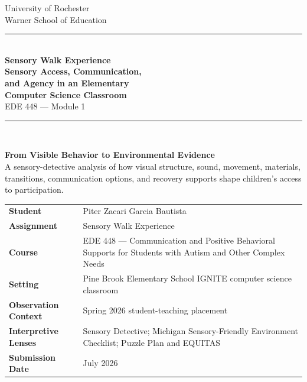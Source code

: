 \documentclass[11pt]{article}
\begin{document}
\hypersetup{pageanchor=false}
\begin{titlepage}
\thispagestyle{empty}

\begin{center}
{\large University of Rochester\\}
{\normalsize Warner School of Education\\[0.15in]}

{\color{PrimaryRed}\rule{\textwidth}{1.4pt}}\\[0.12in]
{\Huge\bfseries Sensory Walk Experience\\[0.08in]
\huge Sensory Access, Communication,\\[0.08in]
and Agency in an Elementary\\[0.08in]
Computer Science Classroom}\\[0.18in]
{\Large EDE 448 --- Module 1}\\[0.12in]

\vfill

{\color{PrimaryRed}\rule{0.78\textwidth}{0.7pt}}\\[0.22in]

\colorbox{SoftBlue}{%
\parbox{0.88\textwidth}{%
\centering\small\vspace{0.02in}
\textbf{From Visible Behavior to Environmental Evidence}\\[0.05in]
A sensory-detective analysis of how visual structure, sound, movement, materials, transitions, communication options, and recovery supports shape children's access to participation.
}%
}
\end{center}

\vfill

\begin{center}
\renewcommand{\arraystretch}{1.18}
\setlength{\tabcolsep}{4pt}
\begin{tabular}{>{\bfseries\RaggedLeft}p{1.55in} p{4.95in}}
Student & Piter Zacari Garcia Bautista \\
Assignment & Sensory Walk Experience \\
Course & EDE 448 --- Communication and Positive Behavioral Supports for Students with Autism and Other Complex Needs \\
Setting & Pine Brook Elementary School IGNITE computer science classroom \\
Observation Context & Spring 2026 student-teaching placement \\
Interpretive Lenses & Sensory Detective; Michigan Sensory-Friendly Environment Checklist; Puzzle Plan and EQUITAS \\
Submission Date & July 2026 \\
\end{tabular}
\end{center}


\end{titlepage}
\end{document}
